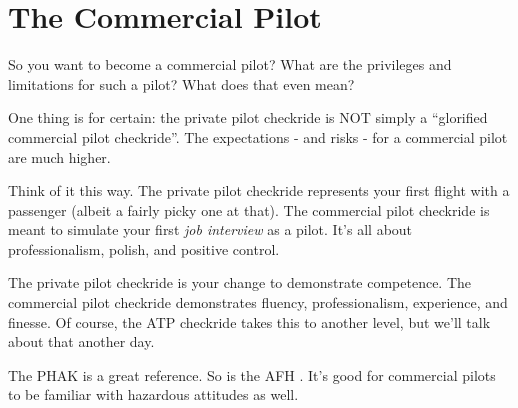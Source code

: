\chapter{The Commercial Pilot}

So you want to become a commercial pilot? What are the privileges and limitations for such a pilot? What does that even mean?

One thing is for certain: the private pilot checkride is NOT simply a ``glorified commercial pilot checkride''. The expectations - and risks - for a commercial pilot are much higher.

Think of it this way. The private pilot checkride represents your first flight with a passenger (albeit a fairly picky one at that). The commercial pilot checkride is meant to simulate your first \emph{job interview} as a pilot. It's all about professionalism, polish, and positive control.

The private pilot checkride is your change to demonstrate competence. The commercial pilot checkride demonstrates fluency, professionalism, experience, and finesse. Of course, the ATP checkride takes this to another level, but we'll talk about that another day.

The PHAK \cite{PHAK} is a great reference. So is the AFH \cite{AFH}. It's good for commercial pilots to be familiar with hazardous attitudes \cite{adm} as well.

